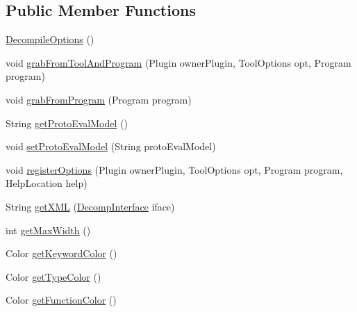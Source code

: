 \subsection*{Public Member Functions}
\begin{DoxyCompactItemize}
\item 
\mbox{\hyperlink{classghidra_1_1app_1_1decompiler_1_1_decompile_options_a6f2f10e8774d7ff64b3fb1ddaa14e24c}{Decompile\+Options}} ()
\item 
void \mbox{\hyperlink{classghidra_1_1app_1_1decompiler_1_1_decompile_options_ab8e3369d5655403883252560a6d48d2f}{grab\+From\+Tool\+And\+Program}} (Plugin owner\+Plugin, Tool\+Options opt, Program program)
\item 
void \mbox{\hyperlink{classghidra_1_1app_1_1decompiler_1_1_decompile_options_ac131faeedb338752984bd62826882313}{grab\+From\+Program}} (Program program)
\item 
String \mbox{\hyperlink{classghidra_1_1app_1_1decompiler_1_1_decompile_options_a5ee64ec215290bbe05f5a342c1bbbe14}{get\+Proto\+Eval\+Model}} ()
\item 
void \mbox{\hyperlink{classghidra_1_1app_1_1decompiler_1_1_decompile_options_a374ea59d7388b41bb6b0e41d815e070c}{set\+Proto\+Eval\+Model}} (String proto\+Eval\+Model)
\item 
void \mbox{\hyperlink{classghidra_1_1app_1_1decompiler_1_1_decompile_options_a3bd0eea3f8f7decda6e0c0dc3232a9b8}{register\+Options}} (Plugin owner\+Plugin, Tool\+Options opt, Program program, Help\+Location help)
\item 
String \mbox{\hyperlink{classghidra_1_1app_1_1decompiler_1_1_decompile_options_a126d2a13ecf64fdd20b32214084795b6}{get\+X\+ML}} (\mbox{\hyperlink{classghidra_1_1app_1_1decompiler_1_1_decomp_interface}{Decomp\+Interface}} iface)
\item 
int \mbox{\hyperlink{classghidra_1_1app_1_1decompiler_1_1_decompile_options_a2927ef22e8d8f4cd2a1fc0bd8d22c3e1}{get\+Max\+Width}} ()
\item 
Color \mbox{\hyperlink{classghidra_1_1app_1_1decompiler_1_1_decompile_options_a10c82b25e43c9dc74fc512d91ecb864f}{get\+Keyword\+Color}} ()
\item 
Color \mbox{\hyperlink{classghidra_1_1app_1_1decompiler_1_1_decompile_options_a9e9dbb09f818c09e9ab487f552d845cf}{get\+Type\+Color}} ()
\item 
Color \mbox{\hyperlink{classghidra_1_1app_1_1decompiler_1_1_decompile_options_a4f985b196eddee83a537f004289fde04}{get\+Function\+Color}} ()
\item 

\end{DoxyCompactItemize}
